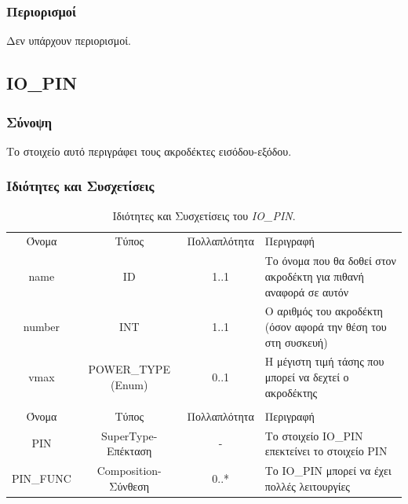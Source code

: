 \subsubsection*{Περιορισμοί}

\noindent Δεν υπάρχουν περιορισμοί.

\subsection{IO\_PIN}
\label{subsec:io_pin}

\subsubsection*{Σύνοψη}

\noindent Το στοιχείο αυτό περιγράφει τους ακροδέκτες εισόδου-εξόδου.

\subsubsection*{Ιδιότητες και Συσχετίσεις}

\begin{table}[H]
	\begin{center}
		\begin{tabular}{ | c | c | c| m{5.5cm} | }
			\hline
			\rowcolor{Gray}
			\multicolumn{4}{|c|}{\textbf{Ιδιότητες}}\\
			\hline
			\rowcolor{Gray}
			Όνομα & Τύπος & Πολλαπλότητα & Περιγραφή \\
			\hline
			name & ID & 1..1 & Το όνομα που θα δοθεί στον ακροδέκτη για πιθανή αναφορά σε αυτόν \\
			\hline
			number & INT & 1..1 & Ο αριθμός του ακροδέκτη (όσον αφορά την θέση του στη συσκευή) \\
			\hline
			vmax & POWER\_TYPE (Enum) & 0..1 & Η μέγιστη τιμή τάσης που μπορεί να δεχτεί ο ακροδέκτης \\
			\hline
			\rowcolor{Gray}
			\multicolumn{4}{|c|}{\textbf{Συσχετίσεις}}\\
			\hline
			\rowcolor{Gray}
			Όνομα & Τύπος & Πολλαπλότητα & Περιγραφή \\
			\hline
			PIN & SuperType-Επέκταση & - &  Το στοιχείο IO\_PIN επεκτείνει το στοιχείο PIN \\
			\hline
			PIN\_FUNC & Composition-Σύνθεση & 0..* &  Το IO\_PIN μπορεί να έχει πολλές λειτουργίες \\
			\hline
		\end{tabular}
		\caption{Ιδιότητες και Συσχετίσεις του \textit{IO\_PIN}.}
		\label{tab:io_pin}
	\end{center}
\end{table}

